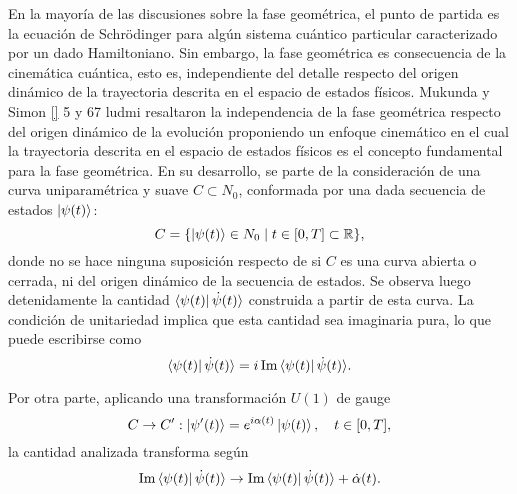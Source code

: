 En la mayoría de las discusiones sobre la fase geométrica, el punto de partida es la ecuación de Schrödinger para algún sistema cuántico particular caracterizado por un dado Hamiltoniano. Sin embargo, la fase geométrica es consecuencia de la cinemática cuántica, esto es, independiente del detalle respecto del origen dinámico de la trayectoria descrita en el espacio de estados físicos. Mukunda y Simon \ref{} 5 y 67 ludmi resaltaron la independencia de la fase geométrica respecto del origen dinámico de la evolución proponiendo un enfoque cinemático en el cual la trayectoria descrita en el espacio de estados físicos es el concepto fundamental para la fase geométrica. En su desarrollo, se parte de la consideración de una curva uniparamétrica y suave \( C \subset N_0 \), conformada por una dada secuencia de estados \( \ket{\psi(t)} \):
\begin{equation}
C = \{ \ket{\psi(t)} \in N_0 \mid t \in [0, T] \subset \mathbb{R} \},
\end{equation}
donde no se hace ninguna suposición respecto de si \( C \) es una curva abierta o cerrada, ni del origen dinámico de la secuencia de estados. Se observa luego detenidamente la cantidad \( \bra{\psi(t)} \dot{\psi}(t) \rangle \) construida a partir de esta curva. La condición de unitariedad implica que esta cantidad sea imaginaria pura, lo que puede escribirse como
\begin{equation}
\bra{\psi(t)} \dot{\psi}(t) \rangle = i \, \text{Im} \bra{\psi(t)} \dot{\psi}(t) \rangle.
\end{equation}

Por otra parte, aplicando una transformación \( U(1) \) de gauge
\begin{equation} \label{eq2:transformacion u1}
C \to C': \ket{\psi'(t)} = e^{i\alpha(t)} \ket{\psi(t)}, \quad t \in [0, T],
\end{equation}
la cantidad analizada transforma según
\begin{equation}
    \text{Im} \bra{\psi(t)} \dot{\psi}(t) \rangle \rightarrow  \text{Im} \bra{\psi(t)} \dot{\psi}(t) \rangle + \dot{\alpha}(t).
\end{equation}

